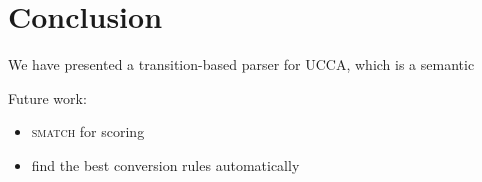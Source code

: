 \documentclass[11pt]{article}
\begin{document}
\section{Conclusion}

We have presented a transition-based parser for UCCA, which is a semantic 

Future work:
\begin{itemize}
\item \textsc{smatch} for scoring
\item find the best conversion rules automatically
\end{itemize}



\end{document}
